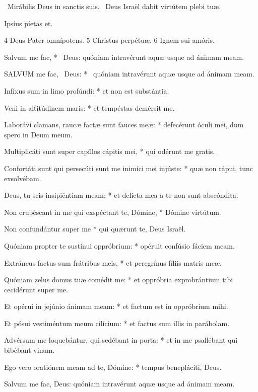 \V\ Mirábilis Deus in sanctis suis. \R\ Deus Israël dabit virtútem plebi tuæ.

 Ipsíus píetas et.

 4 Deus Pater omnípotens. 5 Christus perpétuæ. 6 Ignem sui amóris.


 Salvum me fac, * \textdagger\ Deus: quóniam intravérunt aquæ usque ad ánimam meam. \textdaggerdbl


\lettrine[lines=2]{S}{ALVUM} me fac, \textdagger\ Deus: * \textdaggerdbl\ quóniam intravérunt aquæ usque ad ánimam meam.

Infíxus sum in limo profúndi: * et non est substántia.

Veni in altitúdinem maris: * et tempéstas demérsit me.

Laborávi clamans, raucæ factæ sunt fauces meæ: * defecérunt óculi mei, dum spero in Deum meum.

Multiplicáti sunt super capíllos cápitis mei, * qui odérunt me gratis.

Confortáti sunt qui persecúti sunt me inimíci mei injúste: * quæ non rápui, tunc exsolvébam.

Deus, tu scis insipiéntiam meam: * et delícta mea a te non sunt abscóndita.

Non erubéscant in me qui exspéctant te, Dómine, * Dómine virtútum.

Non confundántur super me * qui quærunt te, Deus Israël.

Quóniam propter te sustínui oppróbrium: * opéruit confúsio fáciem meam.

Extráneus factus sum frátribus meis, * et peregrínus fíliis matris meæ.

Quóniam zelus domus tuæ comédit me: * et oppróbria exprobrántium tibi cecidérunt super me.

Et opérui in jejúnio ánimam meam: * et factum est in oppróbrium mihi.

Et pósui vestiméntum meum cilícium: * et factus sum illis in parábolam.

Advérsum me loquebántur, qui sedébant in porta: * et in me psallébant qui bibébant vinum.

Ego vero oratiónem meam ad te, Dómine: * tempus benepláciti, Deus.

 Salvum me fac, Deus: quóniam intravérunt aquæ usque ad ánimam meam.

